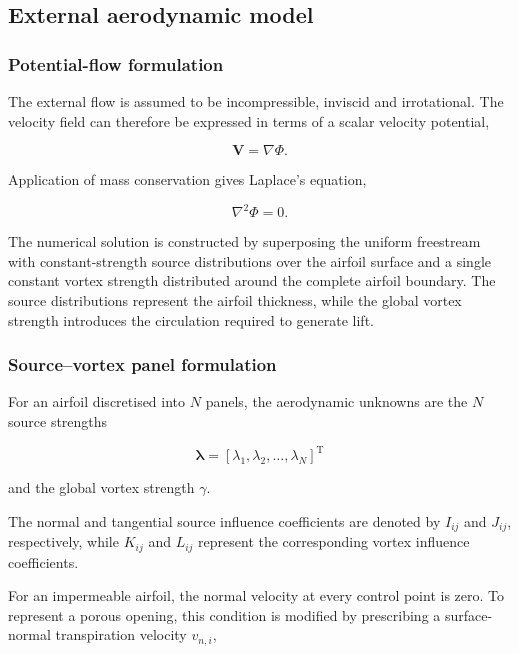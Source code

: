 \documentclass[a4paper,fleqn]{cas-dc}
\begin{document}
\subsection{External aerodynamic model}
\label{subsec:external_aerodynamic_model}


\subsubsection{Potential-flow formulation}

The external flow is assumed to be incompressible, inviscid and
irrotational. The velocity field can therefore be expressed in terms
of a scalar velocity potential,

\begin{equation}
	\boldsymbol{V}
	=
	\nabla\Phi.
\end{equation}

Application of mass conservation gives Laplace's equation,

\begin{equation}
	\nabla^2\Phi
	=
	0.
	\label{eq:laplace}
\end{equation}

The numerical solution is constructed by superposing the uniform
freestream with constant-strength source distributions over the
airfoil surface and a single constant vortex strength distributed
around the complete airfoil boundary. The source distributions
represent the airfoil thickness, while the global vortex strength
introduces the circulation required to generate lift.


\subsubsection{Source--vortex panel formulation}

For an airfoil discretised into $N$ panels, the aerodynamic unknowns
are the $N$ source strengths

\begin{equation}
	\boldsymbol{\lambda}
	=
	\left[
	\lambda_1,\lambda_2,\ldots,\lambda_N
	\right]^{\mathrm T}
\end{equation}

and the global vortex strength $\gamma$.

The normal and tangential source influence coefficients are denoted by
$I_{ij}$ and $J_{ij}$, respectively, while $K_{ij}$ and $L_{ij}$
represent the corresponding vortex influence coefficients.

For an impermeable airfoil, the normal velocity at every control point
is zero. To represent a porous opening, this condition is modified by
prescribing a surface-normal transpiration velocity $v_{n,i}$,
\end{document}
